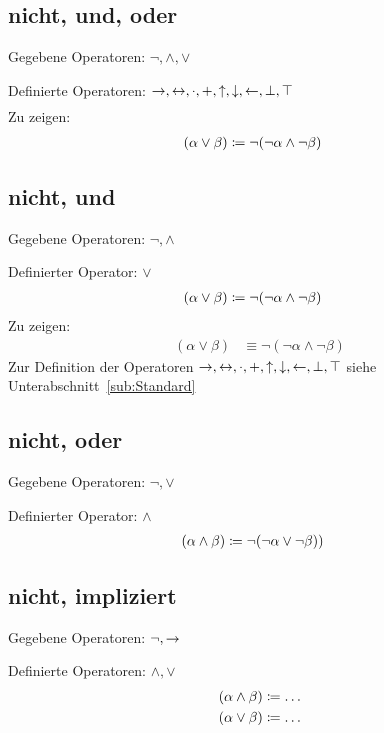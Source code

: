 \documentclass[english,ngerman,parskip=half,headsepline,footsepline]{scrreprt}
\newcommand*{\subsectionname}{Unterabschnitt}
\begin{document}
	\subsection{nicht, und, oder}%
	\label{sub:Standard}
	Gegebene Operatoren: $\lnot,\land,\lor$\par
	Definierte Operatoren: $\rightarrow,\leftrightarrow,\cdot,+,\uparrow,\downarrow,\leftarrow,\bot,\top$
	\begin{align}
	\end{align}
	Zu zeigen:
	\begin{align}
		(\alpha\lor\beta)&\coloneqq\lnot(\lnot\alpha\land\lnot\beta)
	\end{align}

	\subsection{nicht, und}%
	Gegebene Operatoren: $\lnot,\land$\par
	Definierter Operator: $\lor$
	\begin{align}
		(\alpha\lor\beta)&\coloneqq\lnot(\lnot\alpha\land\lnot\beta)
	\end{align}
	Zu zeigen:
	\begin{align}
		(\alpha\lor\beta)&\equiv\lnot(\lnot\alpha\land\lnot\beta)
	\end{align}
	Zur Definition der Operatoren $\rightarrow,\leftrightarrow,\cdot,+,\uparrow,\downarrow,\leftarrow,\bot,\top$ siehe \subsectionname~\vref{sub:Standard}

	\subsection{nicht, oder}%
	Gegebene Operatoren: $\lnot,\lor$\par
	Definierter Operator: $\land$
	\begin{align}
		(\alpha\land\beta)&\coloneqq\lnot(\lnot\alpha\lor\lnot\beta))
	\end{align}

	\subsection{nicht, impliziert}%
	Gegebene Operatoren: $\lnot,\rightarrow$\par
	Definierte Operatoren: $\land,\lor$
	\begin{align}
		(\alpha\land\beta)&\coloneqq\dots\\
		(\alpha\lor\beta)&\coloneqq\dots
	\end{align}
\end{document}
